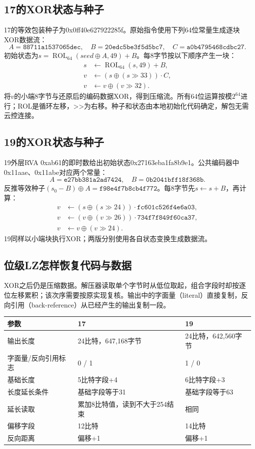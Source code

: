 \documentclass[UTF8,a4paper,zihao=5,fontset=windows]{ctexart}
\newcommand{\code}[1]{{\ttfamily\small #1}}
\begin{document}
\subsection{17的XOR状态与种子}
17的等效包装种子为\code{0x0ff40e627922285f}。原始指令使用下列64位常量生成逐块XOR数据流：
\[
A=\mathtt{88711a1537065dec},\quad
B=\mathtt{20edc5be3f5d5bc7},\quad
C=\mathtt{a0b4795468cdbc27}.
\]
初始状态为$s=\operatorname{ROL}_{64}(seed\oplus A,49)+B$。每8字节按以下顺序产生一块：
\[
\begin{aligned}
s&\leftarrow\operatorname{ROL}_{64}(s,49)+B,\\
v&\leftarrow(s\oplus(s\gg33))\cdot C,\\
v&\leftarrow v\oplus(v\gg32).
\end{aligned}
\]
将$v$的小端8字节与还原后的编码数据XOR，得到压缩流。所有64位运算按模$2^{64}$进行；ROL是循环左移，\code{>>}为右移。种子和状态由本地初始化代码确定，解包无需云控连接。

\subsection{19的XOR状态与种子}
19外层\code{RVA 0xab61}的即时数给出初始状态\code{0x27163eba1fa8b9e1}。公共编码器中\code{0x11aae}、\code{0x11abe}对应两个常量：
\[
A=\mathtt{e27bb381a2ad7424},\quad B=\mathtt{0b2041bff18f368b}.
\]
反推等效种子$(s_0-B)\oplus A=\mathtt{f98e4f7b8cb4f772}$。每8字节先$s\leftarrow s+B$，再计算：
\[
\begin{aligned}
v&\leftarrow(s\oplus(s\gg24))\cdot\mathtt{fc601c526f4e6a03},\\
v&\leftarrow(v\oplus(v\gg26))\cdot\mathtt{734f7f849f60ca37},\\
v&\leftarrow v\oplus(v\gg24).
\end{aligned}
\]
19同样以小端块执行XOR；两版分别使用各自状态变换生成数据流。

\subsection{位级LZ怎样恢复代码与数据}
XOR之后仍是压缩数据。解压器读取单个字节时从低位取起，组合字段时却按逐位左移累积；该次序需要按原实现复核。输出中的字面量（literal）直接复制，反向引用（back-reference）从已经产生的输出复制一段。
\par\medskip\noindent\begin{tabularx}{\linewidth}{@{}L{35mm}Y Y@{}}\toprule 参数 & 17 & 19\\\midrule
输出长度 & 24比特，647,168字节 & 24比特，642,560字节\\
字面量/反向引用标志 & 0 / 1 & 1 / 0\\
基础长度 & 5比特字段+4 & 6比特字段+3\\
长度延长条件 & 基础字段等于31 & 基础字段等于63\\
延长读取 & 累加8比特值，读到不大于254结束 & 相同\\
偏移字段 & 12比特 & 14比特\\
反向距离 & 偏移+1 & 偏移+1\\\bottomrule\end{tabularx}\par\medskip
\end{document}

